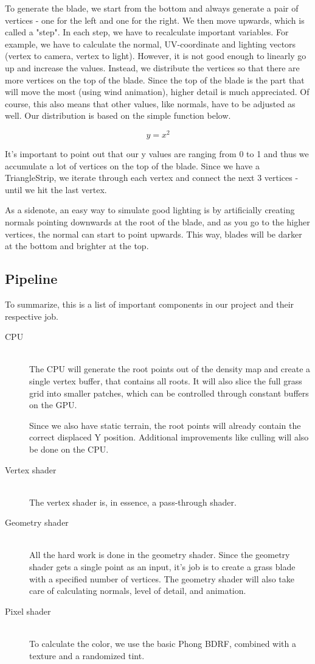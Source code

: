 \documentclass[conference]{acmsiggraph}
\begin{document}
To generate the blade, we start from the bottom and always generate a pair of vertices - one for the left and one for the right. We then move upwards, which is called a "step". In each step, we have to recalculate important variables. For example, we have to calculate the normal, UV-coordinate and lighting vectors (vertex to camera, vertex to light). However, it is not good enough to linearly go up and increase the values. Instead, we distribute the vertices so that there are more vertices on the top of the blade. Since the top of the blade is the part that will move the most (using wind animation), higher detail is much appreciated. Of course, this also means that other values, like normals, have to be adjusted as well. Our distribution is based on the simple function below.

\begin{equation}
y = x^2
\end{equation}

It's important to point out that our y values are ranging from 0 to 1 and thus we accumulate a lot of vertices on the top of the blade. Since we have a TriangleStrip, we iterate through each vertex and connect the next 3 vertices - until we hit the last vertex.

As a sidenote, an easy way to simulate good lighting is by artificially creating normals pointing downwards at the root of the blade, and as you go to the higher vertices, the normal can start to point upwards. This way, blades will be darker at the bottom and brighter at the top.

\subsection{Pipeline}
To summarize, this is a list of important components in our project and their respective job.
\begin{description}
  \item[CPU] \hfill \\
  The CPU will generate the root points out of the density map and create a single vertex buffer, that contains all roots. It will also slice the full grass grid into smaller patches, which can be controlled through constant buffers on the GPU.
  
  Since we also have static terrain, the root points will already contain the correct displaced Y position. Additional improvements like culling will also be done on the CPU.
  \item[Vertex shader] \hfill \\
  The vertex shader is, in essence, a pass-through shader.
  \item[Geometry shader] \hfill \\
  All the hard work is done in the geometry shader. Since the geometry shader gets a single point as an input, it's job is to create a grass blade with a specified number of vertices. The geometry shader will also take care of calculating normals, level of detail, and animation.
  \item[Pixel shader] \hfill \\
  To calculate the color, we use the basic Phong BDRF, combined with a texture and a randomized tint.
\end{description}
\end{document}
